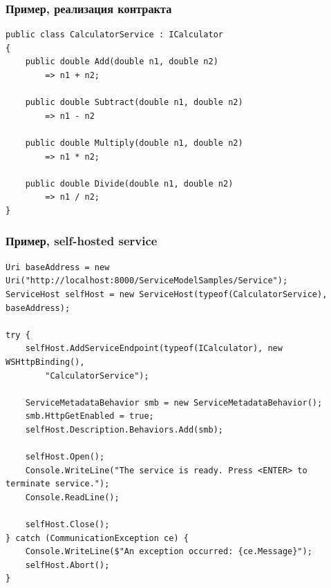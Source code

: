 \documentclass{../../slides-style}
\begin{document}
    \begin{frame}[fragile]
        \frametitle{Пример, реализация контракта}
        \begin{small}
            \begin{verbatim}
public class CalculatorService : ICalculator  
{
    public double Add(double n1, double n2)
        => n1 + n2;  

    public double Subtract(double n1, double n2)
        => n1 - n2

    public double Multiply(double n1, double n2)  
        => n1 * n2;

    public double Divide(double n1, double n2)  
        => n1 / n2;
}
            \end{verbatim}
        \end{small}
    \end{frame}

    \begin{frame}[fragile]
        \frametitle{Пример, self-hosted service}
        \begin{scriptsize}
            \begin{verbatim}
Uri baseAddress = new Uri("http://localhost:8000/ServiceModelSamples/Service");
ServiceHost selfHost = new ServiceHost(typeof(CalculatorService), baseAddress);

try {
    selfHost.AddServiceEndpoint(typeof(ICalculator), new WSHttpBinding(), 
        "CalculatorService");

    ServiceMetadataBehavior smb = new ServiceMetadataBehavior();
    smb.HttpGetEnabled = true;
    selfHost.Description.Behaviors.Add(smb);

    selfHost.Open();
    Console.WriteLine("The service is ready. Press <ENTER> to terminate service.");
    Console.ReadLine();

    selfHost.Close();  
} catch (CommunicationException ce) {
    Console.WriteLine($"An exception occurred: {ce.Message}");
    selfHost.Abort();
}
            \end{verbatim}
        \end{scriptsize}
    \end{frame}
\end{document}
